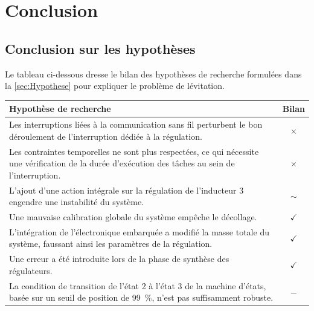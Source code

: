 \chapter{Conclusion}

\section{Conclusion sur les hypothèses}

Le tableau ci-dessous dresse le bilan des hypothèses de recherche formulées dans la \autoref{sec:Hypothese} pour expliquer le problème de lévitation.

\begin{table}[htbp]
    \centering
    \renewcommand{\arraystretch}{1.5} %
    \begin{tabular}{|p{12cm}|c|}
        \hline
        \textbf{Hypothèse de recherche}                                                                                                                      & \textbf{Bilan} \\
        \hline
        Les interruptions liées à la communication sans fil perturbent le bon déroulement de l'interruption dédiée à la régulation.                          & $\times$       \\
        \hline
        Les contraintes temporelles ne sont plus respectées, ce qui nécessite une vérification de la durée d'exécution des tâches au sein de l'interruption. & $\times$       \\
        \hline
        L'ajout d'une action intégrale sur la régulation de l'inducteur 3 engendre une instabilité du système.                                               & $\sim$         \\
        \hline
        Une mauvaise calibration globale du système empêche le décollage.                                                                                    & $\checkmark$   \\
        \hline
        L'intégration de l'électronique embarquée a modifié la masse totale du système, faussant ainsi les paramètres de la régulation.                      & $\checkmark$   \\
        \hline
        Une erreur a été introduite lors de la phase de synthèse des régulateurs.                                                                            & $\checkmark$   \\
        \hline
        La condition de transition de l'état 2 à l'état 3 de la machine d'états, basée sur un seuil de position de 99~\%, n'est pas suffisamment robuste.    & $-$            \\

\end{tabular}
\end{table}
